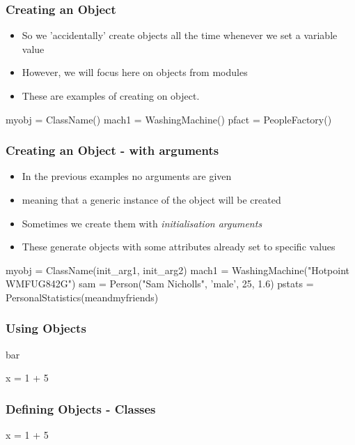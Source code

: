 \documentclass{beamer}
\begin{document}
\begin{frame}[fragile]
\frametitle{Creating an Object}
\begin{itemize}
\item So we 'accidentally' create objects all the time whenever we set a variable value
\item However, we will focus here on objects from modules
\item These are examples of creating on object.
\end{itemize}

\begin{code}
myobj = ClassName()
mach1 = WashingMachine()
pfact = PeopleFactory()
\end{code}

\end{frame}

\begin{frame}[fragile]
\frametitle{Creating an Object - with arguments}

\begin{itemize}
\item In the previous examples no arguments are given
\item meaning that a generic instance of the object will be created
\item Sometimes we create them with \emph{initialisation arguments}
\item These generate objects with some attributes already set to specific values
\end{itemize}

\begin{code}
myobj = ClassName(init_arg1, init_arg2)
mach1 = WashingMachine("Hotpoint WMFUG842G")
sam = Person("Sam Nicholls", 'male', 25, 1.6)
pstats = PersonalStatistics(meandmyfriends)
\end{code}
\end{frame}

\begin{frame}[fragile]
\frametitle{Using Objects}
bar
\begin{code}
x = 1 + 5
\end{code}
\end{frame}

\begin{frame}[fragile]
\frametitle{Defining Objects - Classes}
\begin{code}
x = 1 + 5
\end{code}
\end{frame}
\end{document}

